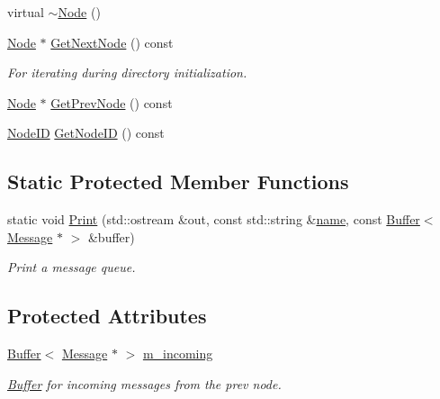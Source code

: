 \begin{DoxyCompactItemize}
virtual \hyperlink{class_simulator_1_1_c_d_m_a_1_1_node_aa5c135912ba25d505d83a9a0dfd572b6}{$\sim$\+Node} ()
\item 
\hyperlink{class_simulator_1_1_c_d_m_a_1_1_node}{Node} $\ast$ \hyperlink{class_simulator_1_1_c_d_m_a_1_1_node_a71fddbab38a429d201d90946539d4b45}{Get\+Next\+Node} () const 
\begin{DoxyCompactList}\small\item\em For iterating during directory initialization. \end{DoxyCompactList}\item 
\hyperlink{class_simulator_1_1_c_d_m_a_1_1_node}{Node} $\ast$ \hyperlink{class_simulator_1_1_c_d_m_a_1_1_node_ad76cc7de4bc45446c3c159dddf7dfc09}{Get\+Prev\+Node} () const 
\item 
\hyperlink{class_simulator_1_1_c_d_m_a_a59272166fd32e642f3113c22cc756927}{Node\+I\+D} \hyperlink{class_simulator_1_1_c_d_m_a_1_1_node_a1ac15df54fb74f178a68e9a1d08be11a}{Get\+Node\+I\+D} () const 
\end{DoxyCompactItemize}
\subsection*{Static Protected Member Functions}
\begin{DoxyCompactItemize}
\item 
static void \hyperlink{class_simulator_1_1_c_d_m_a_1_1_node_ab6d5024a1869a00d0a09d971c0751d2e}{Print} (std\+::ostream \&out, const std\+::string \&\hyperlink{mtconf_8c_a8f8f80d37794cde9472343e4487ba3eb}{name}, const \hyperlink{class_simulator_1_1_buffer}{Buffer}$<$ \hyperlink{union_simulator_1_1_c_d_m_a_1_1_node_1_1_message}{Message} $\ast$ $>$ \&buffer)
\begin{DoxyCompactList}\small\item\em Print a message queue. \end{DoxyCompactList}\end{DoxyCompactItemize}
\subsection*{Protected Attributes}
\begin{DoxyCompactItemize}
\item 
\hyperlink{class_simulator_1_1_buffer}{Buffer}$<$ \hyperlink{union_simulator_1_1_c_d_m_a_1_1_node_1_1_message}{Message} $\ast$ $>$ \hyperlink{class_simulator_1_1_c_d_m_a_1_1_node_a5529a328db462990892f94b8553024c5}{m\+\_\+incoming}
\begin{DoxyCompactList}\small\item\em \hyperlink{class_simulator_1_1_buffer}{Buffer} for incoming messages from the prev node. \end{DoxyCompactList}\end{DoxyCompactItemize}
